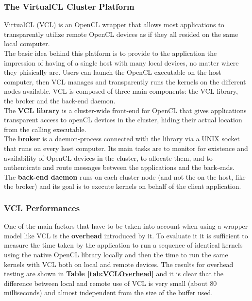 \subsubsection{The VirtualCL Cluster Platform}
VirtualCL (VCL) is an OpenCL wrapper that allows most applications to transparently utilize remote OpenCL devices as if they all resided on the same local computer.\\
The basic idea behind this platform is to provide to the application the impression of having of a single host with many local devices, no matter where they phisically are. Users can launch the OpenCL executable on the host computer, then VCL manages and transparently runs the kernels on the different nodes available.
VCL is composed of three main components: the VCL library, the broker and the back-end daemon.\\
The \textbf{VCL library} is a cluster-wide front-end for OpenCL that gives applications transparent access to openCL devices in the cluster, hiding their actual location from the calling executable.\\
The \textbf{broker} is a daemon-process connected with the library via a UNIX socket that runs on every host computer. Its main tasks are to monitor for existence and availability of OpenCL devices in the cluster, to allocate them, and to authenticate and route messages between the applications and the back-ends.\\
The \textbf{back-end daemon} runs on each cluster node (and not the on the host, like the broker) and its goal is to execute kernels on behalf of the client application.

\subsubsection{VCL Performances}
One of the main factors that have to be taken into account when using a wrapper model like VCL is the \textbf{overhead} introduced by it. To evaluate it it is sufficient to measure the time taken by the application to run a sequence of identical kernels using the native OpenCL library locally and then the time to run the same kernels with VCL both on local and remote devices. The results for overhead testing are shown in \textbf{Table \ref{tab:VCLOverhead}} and it is clear that the difference between local and remote use of VCL is very small (about 80 milliseconds) and almost independent from the size of the buffer used.\\

